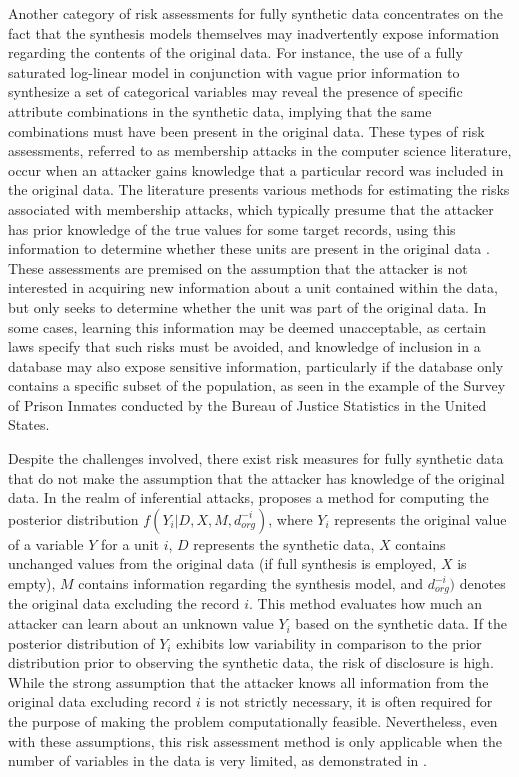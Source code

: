 Another category of risk assessments for fully synthetic data concentrates on the fact that the synthesis models themselves may inadvertently expose information regarding the contents of the original data. For instance, the use of a fully saturated log-linear model in conjunction with vague prior information to synthesize a set of categorical variables may reveal the presence of specific attribute combinations in the synthetic data, implying that the same combinations must have been present in the original data. These types of risk assessments, referred to as membership attacks in the computer science literature, occur when an attacker gains knowledge that a particular record was included in the original data. The literature presents various methods for estimating the risks associated with membership attacks, which typically presume that the attacker has prior knowledge of the true values for some target records, using this information to determine whether these units are present in the original data \citep{stadler2022synthetic}. These assessments are premised on the assumption that the attacker is not interested in acquiring new information about a unit contained within the data, but only seeks to determine whether the unit was part of the original data. In some cases, learning this information may be deemed unacceptable, as certain laws specify that such risks must be avoided, and knowledge of inclusion in a database may also expose sensitive information, particularly if the database only contains a specific subset of the population, as seen in the example of the Survey of Prison Inmates conducted by the Bureau of Justice Statistics in the United States.

Despite the challenges involved, there exist risk measures for fully synthetic data that do not make the assumption that the attacker has knowledge of the original data. In the realm of inferential attacks, \citet{reiter2014bayesian} proposes a method for computing the posterior distribution $f(Y_i |D,X,M,d_{org}^{-i})$, where $Y_i$ represents the original value of a variable $Y$ for a unit $i$, $D$ represents the synthetic data, $X$ contains unchanged values from the original data (if full synthesis is employed, $X$ is empty), $M$ contains information regarding the synthesis model, and $d_{org}^{-i})$ denotes the original data excluding the record $i$. This method evaluates how much an attacker can learn about an unknown value $Y_i$ based on the synthetic data. If the posterior distribution of $Y_i$ exhibits low variability in comparison to the prior distribution prior to observing the synthetic data, the risk of disclosure is high. While the strong assumption that the attacker knows all information from the original data excluding record $i$ is not strictly necessary, it is often required for the purpose of making the problem computationally feasible. Nevertheless, even with these assumptions, this risk assessment method is only applicable when the number of variables in the data is very limited, as demonstrated in \cite{hu2014disclosure}.

